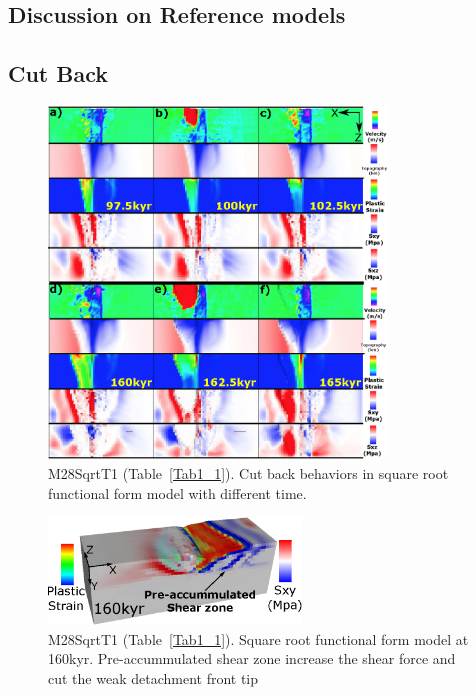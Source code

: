 \subsection{Discussion on Reference models}

\iffalse
\subsection{Cut Back}\label{Sec_CutBack}

\begin{figure}[h]
  \centering
    \includegraphics[width=0.8\textwidth]{./Figures/fig_Results4_4_sqrt_cut_back_with_time.eps}
  \caption{M28SqrtT1 (Table~\hyperref[Tab1_1]{\ref{Tab1_1}}). Cut back behaviors in square root functional form model with different time.}
 \label{fig_Results4_4}
\end{figure}   

\begin{figure}[h]
  \centering
    \includegraphics[width=0.6\textwidth]{./Figures/fig_Results4_5_sqrt_cut_back_pre_accummulated_shear_zone.eps}
  \caption{M28SqrtT1 (Table~\hyperref[Tab1_1]{\ref{Tab1_1}}). Square root functional form model at 160kyr. Pre-accummulated shear zone increase the shear force and cut the weak detachment front tip}
 \label{fig_Results4_5}
\end{figure}   

